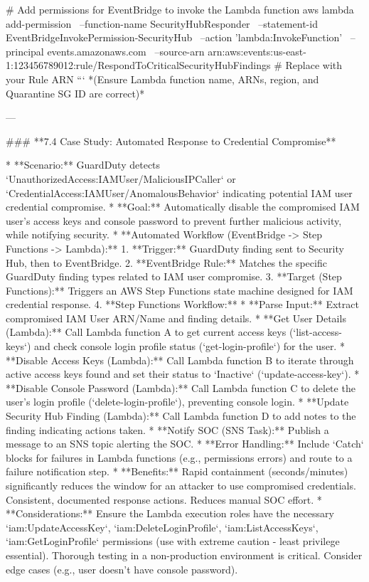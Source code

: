 \documentclass{article}
\begin{document}
# Add permissions for EventBridge to invoke the Lambda function
aws lambda add-permission \
    --function-name SecurityHubResponder \
    --statement-id EventBridgeInvokePermission-SecurityHub \
    --action 'lambda:InvokeFunction' \
    --principal events.amazonaws.com \
    --source-arn arn:aws:events:us-east-1:123456789012:rule/RespondToCriticalSecurityHubFindings # Replace with your Rule ARN
```
*(Ensure Lambda function name, ARNs, region, and Quarantine SG ID are correct)*

---

### **7.4 Case Study: Automated Response to Credential Compromise**

* **Scenario:** GuardDuty detects `UnauthorizedAccess:IAMUser/MaliciousIPCaller` or `CredentialAccess:IAMUser/AnomalousBehavior` indicating potential IAM user credential compromise.
* **Goal:** Automatically disable the compromised IAM user's access keys and console password to prevent further malicious activity, while notifying security.
* **Automated Workflow (EventBridge -> Step Functions -> Lambda):**
    1.  **Trigger:** GuardDuty finding sent to Security Hub, then to EventBridge.
    2.  **EventBridge Rule:** Matches the specific GuardDuty finding types related to IAM user compromise.
    3.  **Target (Step Functions):** Triggers an AWS Step Functions state machine designed for IAM credential response.
    4.  **Step Functions Workflow:**
        * **Parse Input:** Extract compromised IAM User ARN/Name and finding details.
        * **Get User Details (Lambda):** Call Lambda function A to get current access keys (`list-access-keys`) and check console login profile status (`get-login-profile`) for the user.
        * **Disable Access Keys (Lambda):** Call Lambda function B to iterate through active access keys found and set their status to `Inactive` (`update-access-key`).
        * **Disable Console Password (Lambda):** Call Lambda function C to delete the user's login profile (`delete-login-profile`), preventing console login.
        * **Update Security Hub Finding (Lambda):** Call Lambda function D to add notes to the finding indicating actions taken.
        * **Notify SOC (SNS Task):** Publish a message to an SNS topic alerting the SOC.
        * **Error Handling:** Include `Catch` blocks for failures in Lambda functions (e.g., permissions errors) and route to a failure notification step.
* **Benefits:** Rapid containment (seconds/minutes) significantly reduces the window for an attacker to use compromised credentials. Consistent, documented response actions. Reduces manual SOC effort.
* **Considerations:** Ensure the Lambda execution roles have the necessary `iam:UpdateAccessKey`, `iam:DeleteLoginProfile`, `iam:ListAccessKeys`, `iam:GetLoginProfile` permissions (use with extreme caution - least privilege essential). Thorough testing in a non-production environment is critical. Consider edge cases (e.g., user doesn't have console password).
\end{document}
